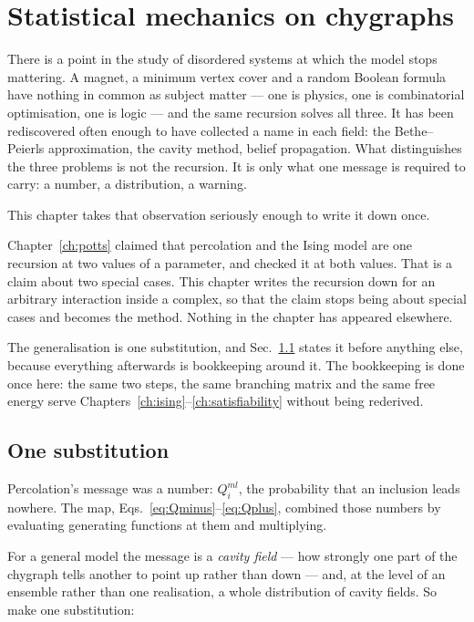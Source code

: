 \chapter{Statistical mechanics on chygraphs}
\label{ch:statmech}

There is a point in the study of disordered systems at which the model stops
mattering. A magnet, a minimum vertex cover and a random Boolean formula have
nothing in common as subject matter --- one is physics, one is combinatorial
optimisation, one is logic --- and the same recursion solves all three. It has
been rediscovered often enough to have collected a name in each field: the
Bethe--Peierls approximation, the cavity method, belief propagation. What
distinguishes the three problems is not the recursion. It is only what one
message is required to carry: a number, a distribution, a warning.

This chapter takes that observation seriously enough to write it down once.

Chapter~\ref{ch:potts} claimed that percolation and the Ising model are one
recursion at two values of a parameter, and checked it at both values. That is a
claim about two special cases. This chapter writes the recursion down for
an arbitrary interaction inside a complex, so that the claim stops being about
special cases and becomes the method. Nothing in the chapter has appeared
elsewhere.

The generalisation is one substitution, and Sec.~\ref{sec:substitution} states
it before anything else, because everything afterwards is bookkeeping around
it. The bookkeeping is done once here: the same two steps,
the same branching matrix and the same free energy serve
Chapters~\ref{ch:ising}--\ref{ch:satisfiability} without being rederived.

\section{One substitution}
\label{sec:substitution}

Percolation's message was a number: $Q^{ml}_{i}$, the probability that an
inclusion leads nowhere. The map, Eqs.~\eqref{eq:Qminus}--\eqref{eq:Qplus},
combined those numbers by evaluating generating functions at them and
multiplying.

For a general model the message is a \emph{cavity field} --- how strongly one
part of the chygraph tells another to point up rather than down --- and, at the
level of an ensemble rather than one realisation, a whole distribution of
cavity fields. So make one substitution:

